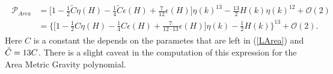 \documentclass[a4paper,12pt, DIV=14, BCOR=5mm, twoside, headsepline, numbers=noenddot]{scrbook}
\begin{document}
\begin{align} \label{AreaPoly}
\begin{aligned}
    \mathcal{P}_{Area} &= \bigl[1 - \frac{1}{2} \tilde{C}\eta(H) - \frac{1}{4} \tilde{C} \epsilon(H) + \frac{7}{12} \epsilon(H) \bigr] \eta(k)^{13} - \frac{13}{2}H(k) \eta(k)^{12} + \mathcal{O}(2) \\
    &=\bigl\{  \bigl[ 1 - \frac{1}{2} C \eta(H) - \frac{1}{4} C \epsilon(H) +  \frac{7}{12\cdot13} \epsilon(H) \bigr] \eta(k) - \frac{1}{2} H(k)       \bigr\}^{13} + \mathcal{O}(2).
\end{aligned}
\end{align}
Here $C$ is a constant the depends on the parametes that are left in (\ref{LArea}) and $\Tilde{C} = 13 C$.
There is a slight caveat in the computation of this expression for the Area Metric Gravity polynomial. 
\end{document}
